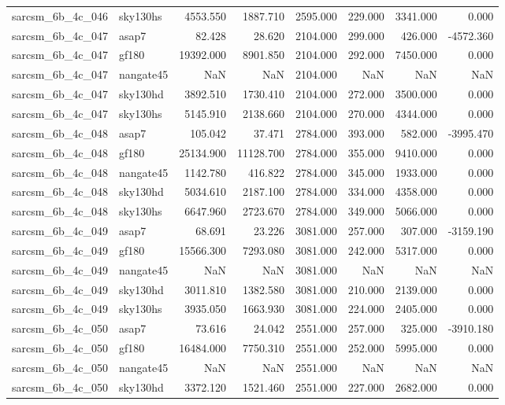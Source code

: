 \begin{tabular}{llrrrrrr}
sarcsm\_6b\_4c\_046 & sky130hs & 4553.550 & 1887.710 & 2595.000 & 229.000 & 3341.000 & 0.000 \\
sarcsm\_6b\_4c\_047 & asap7 & 82.428 & 28.620 & 2104.000 & 299.000 & 426.000 & -4572.360 \\
sarcsm\_6b\_4c\_047 & gf180 & 19392.000 & 8901.850 & 2104.000 & 292.000 & 7450.000 & 0.000 \\
sarcsm\_6b\_4c\_047 & nangate45 & NaN & NaN & 2104.000 & NaN & NaN & NaN \\
sarcsm\_6b\_4c\_047 & sky130hd & 3892.510 & 1730.410 & 2104.000 & 272.000 & 3500.000 & 0.000 \\
sarcsm\_6b\_4c\_047 & sky130hs & 5145.910 & 2138.660 & 2104.000 & 270.000 & 4344.000 & 0.000 \\
sarcsm\_6b\_4c\_048 & asap7 & 105.042 & 37.471 & 2784.000 & 393.000 & 582.000 & -3995.470 \\
sarcsm\_6b\_4c\_048 & gf180 & 25134.900 & 11128.700 & 2784.000 & 355.000 & 9410.000 & 0.000 \\
sarcsm\_6b\_4c\_048 & nangate45 & 1142.780 & 416.822 & 2784.000 & 345.000 & 1933.000 & 0.000 \\
sarcsm\_6b\_4c\_048 & sky130hd & 5034.610 & 2187.100 & 2784.000 & 334.000 & 4358.000 & 0.000 \\
sarcsm\_6b\_4c\_048 & sky130hs & 6647.960 & 2723.670 & 2784.000 & 349.000 & 5066.000 & 0.000 \\
sarcsm\_6b\_4c\_049 & asap7 & 68.691 & 23.226 & 3081.000 & 257.000 & 307.000 & -3159.190 \\
sarcsm\_6b\_4c\_049 & gf180 & 15566.300 & 7293.080 & 3081.000 & 242.000 & 5317.000 & 0.000 \\
sarcsm\_6b\_4c\_049 & nangate45 & NaN & NaN & 3081.000 & NaN & NaN & NaN \\
sarcsm\_6b\_4c\_049 & sky130hd & 3011.810 & 1382.580 & 3081.000 & 210.000 & 2139.000 & 0.000 \\
sarcsm\_6b\_4c\_049 & sky130hs & 3935.050 & 1663.930 & 3081.000 & 224.000 & 2405.000 & 0.000 \\
sarcsm\_6b\_4c\_050 & asap7 & 73.616 & 24.042 & 2551.000 & 257.000 & 325.000 & -3910.180 \\
sarcsm\_6b\_4c\_050 & gf180 & 16484.000 & 7750.310 & 2551.000 & 252.000 & 5995.000 & 0.000 \\
sarcsm\_6b\_4c\_050 & nangate45 & NaN & NaN & 2551.000 & NaN & NaN & NaN \\
sarcsm\_6b\_4c\_050 & sky130hd & 3372.120 & 1521.460 & 2551.000 & 227.000 & 2682.000 & 0.000 \\

\end{tabular}
